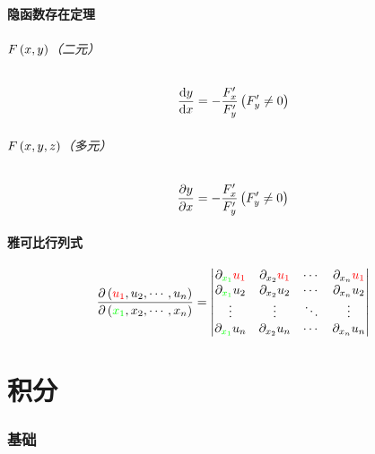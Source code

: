 \documentclass{article}
\begin{document}
\subsection{隐函数存在定理}

\paragraph{$F\left(x,y\right)$（二元）}

\[\frac{\mathrm d y}{\mathrm d x}=-\frac{F_x^\prime}{F_y^\prime}\left(F_y^\prime\neq0\right)\]

\paragraph{$F\left(x,y,z\right)$（多元）}

\[\frac{\partial y}{\partial x}=-\frac{F_x^\prime}{F_y^\prime}\left(F_y^\prime\neq0\right)\]

\subsection{雅可比行列式}

\[\frac{\partial\left(\textcolor{red}{u_1},u_2,\cdots,u_n\right)}{\partial\left(\textcolor{green}{x_1},x_2,\cdots,x_n\right)}=
    \begin{vmatrix}
        \partial_{\textcolor{green}{x_1}}\textcolor{red}{u_1} & \partial_{x_2}\textcolor{red}{u_1} &
        \cdots                                                & \partial_{x_n}\textcolor{red}{u_1}                   \\
        \partial_{\textcolor{green}{x_1}}u_2                  & \partial_{x_2}u_2                  &
        \cdots                                                & \partial_{x_n}u_2                                    \\
        \vdots                                                & \vdots                             & \ddots & \vdots \\
        \partial_{\textcolor{green}{x_1}}u_n                  & \partial_{x_2}u_n                  &
        \cdots                                                & \partial_{x_n}u_n
    \end{vmatrix}\]

\part{积分}

\section{基础}
\end{document}
